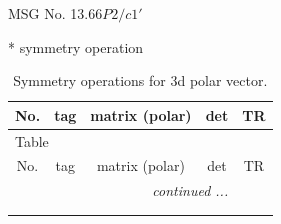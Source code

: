 \documentclass[fleqn,8pt]{jsarticle}
\begin{document}
\setcounter{MaxMatrixCols}{32}

\renewcommand{\tablename}{Table~}
\renewcommand{\figurename}{Figure~}
\begin{center}
\LARGE
MSG No. 13.66\quad$P2/c1'$
\end{center}
* symmetry operation
\renewcommand{\arraystretch}{1.3}
\begin{longtable}{ccccc}
\caption{Symmetry operations for 3d polar vector.}
 \\
 \hline \hline
No. & tag & matrix (polar) & det & TR \\ \hline \endfirsthead

\multicolumn{4}{l}{\tablename\ \thetable{}} \\
 \hline \hline
No. & tag & matrix (polar) & det & TR \\ \hline \endhead

 \hline \hline
\multicolumn{4}{r}{\footnotesize\it continued ...} \\ \endfoot

 \hline \hline
\multicolumn{4}{r}{} \\ \endlastfoot


\end{longtable}
\end{document}
